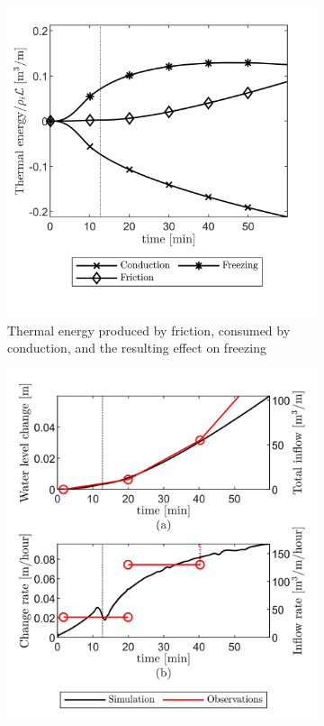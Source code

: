\documentclass[3p]{elsarticle} %
\begin{document}
\begin{figure}
\begin{subfigure}[b]{8cm}
         \includegraphics{../Figures/Thermals.png}
         \caption{Thermal energy produced by friction, consumed by conduction, and the resulting effect on freezing}
         \label{fig:3}
     \end{subfigure}
     \begin{subfigure}[b]{8cm}
         \centering
         \includegraphics{../Figures/FluidFluxes.png}

\end{subfigure}
\end{figure}
\end{document}
